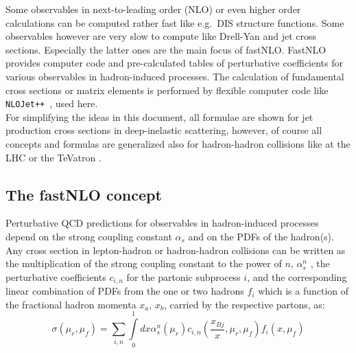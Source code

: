 \documentclass{DISproc}
\begin{document}
Some observables in next-to-leading order (NLO) or even higher order calculations can be computed rather fast like e.g.\  DIS structure functions. 
Some observables however are very slow to compute like Drell-Yan and jet cross sections. Especially the latter ones are the main focus of fastNLO.
FastNLO provides computer code and pre-calculated tables of perturbative coefficients for various observables in hadron-induced processes.
The calculation of fundamental cross sections or matrix elements is performed by flexible computer code like \texttt{NLOJet++}~\cite{Nagy:99,Nagy:01}, used here.\\

For simplifying the ideas in this document, all formulae are shown for jet production cross sections in deep-inelastic scattering, however, of course all concepts and formulas are generalized also for hadron-hadron collisions like at the LHC or the TeVatron \cite{Kluge:2006xs}.\\


\subsection{The fastNLO concept}

Perturbative QCD predictions for observables in hadron-induced processes depend on
the strong coupling constant $\alpha_s$ and on the PDFs of the hadron(s). Any cross section
in lepton-hadron or hadron-hadron collisions can be written as the multiplication of the strong coupling
constant to the power of $n$, $\alpha_s^n$ , the perturbative coefficients $c_{i,n}$ for the partonic subprocess $i$,
and the corresponding linear combination of PDFs from the one or two hadrons $f_i$ which is
a function of the fractional hadron momenta $x_a$, $x_b$, carried by the respective partons, as:
\begin{equation}\label{eq:CrossSection}
  \sigma(\mu_r,\mu_f) =
  \sum\limits_{i,n}\int\limits_0^1dx\alpha_s^n(\mu_r)c_{i,n}(\frac{x_{Bj}}{x},\mu_r,\mu_f)f_i(x,\mu_f)
\end{equation}
\end{document}
